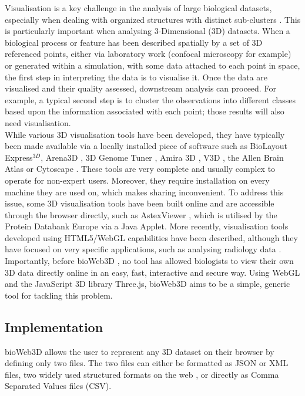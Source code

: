 Visualisation is a key challenge in the analysis of large biological datasets, especially when dealing with organized structures with distinct sub-clusters \citep{Rubel10}. This is particularly important when analysing 3-Dimensional (3D) datasets. When a biological process or feature has been described spatially by a set of 3D referenced points, either via laboratory work (confocal microscopy for example) or generated within a simulation, with some data attached to each point in space, the first step in interpreting the data is to visualise it. Once the data are visualised and their quality assessed, downstream analysis can proceed. For example, a typical second step is to cluster the observations into different classes based upon the information associated with each point; those results will also need visualisation. \\

While various 3D visualisation tools have been developed, they have typically been made available via a locally installed piece of software such as BioLayout Express$^{3D}$\citep{Freeman07}, Arena3D \citep{Pavlopoulos08},  3D Genome Tuner \citep{Wang093D}, Amira 3D \citep{Stalling05}, V3D \citep{Peng10}, the Allen Brain Atlas \citep{Lein07} or Cytoscape \citep{Shannon03}. These tools are very complete and usually complex to operate for non-expert users. Moreover, they require installation on every machine they are used on, which makes sharing inconvenient. To address this issue, some 3D visualisation tools have been built online and are accessible through the browser directly, such as AstexViewer \citep{Hartshorn02}, which is utilised by the Protein Databank Europe via a Java Applet. More recently, visualisation tools developed using HTML5/WebGL capabilities have been described, although they have focused on very specific applications, such as analysing radiology data  \citep{Dinesh12}.\\

Importantly, before bioWeb3D \citep{Pettit13}, no tool has allowed biologists to view their own 3D data directly online in an easy, fast, interactive and secure way. Using WebGL and the JavaScript 3D library Three.js, bioWeb3D aims to be a simple, generic tool for tackling this problem.\\

	\subsection{Implementation}

bioWeb3D allows the user to represent any 3D dataset on their browser by defining only two files. The two files can either be formatted as JSON or XML files, two widely used structured formats on the web \citep{Wilde07}, or directly as Comma Separated Values files (CSV).\\

